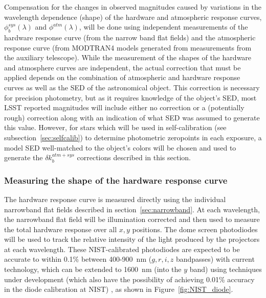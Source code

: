 \documentclass[12pt,preprint]{aastex}
\begin{document}
Compensation for the changes in observed magnitudes caused by
variations in the wavelength dependence (shape) of the hardware and
atmospheric response curves, $\phi_b^{sys}(\lambda)$ and
$\phi^{atm}(\lambda)$, will be done using independent measurements of
the hardware response curve (from the narrow band flat fields) and the
atmospheric response curve (from MODTRAN4 models generated from
measurements from the auxiliary telescope).  While the measurement of
the shapes of the hardware and atmosphere curves are independent, the
actual correction that must be applied depends on the combination of
atmospheric and hardware response curves as well as the SED of the
astronomical object.  This correction is necessary for precision
photometry, but as it requires knowledge of the object's SED, most
LSST reported magnitudes will include either no correction or a
(potentially rough) correction along with an indication of what SED
was assumed to generate this value. However, for stars which will be
used in self-calibration (see subsection~\ref{sec:selfcalib}) to
determine photometric zeropoints in each exposure, a model SED
well-matched to the object's colors will be chosen and used to
generate the $\delta k_b^{atm+sys}$ corrections described in this
section.

\subsubsection{Measuring the shape of the hardware response curve}
\label{sec:phi_hardware}

The hardware response curve is measured directly using the individual
narrowband flat fields described in section~\ref{sec:narrowband}. At
each wavelength, the narrowband flat field will be illumination
corrected and then used to measure the total hardware response over
all $x,y$ positions. The dome screen photodiodes will be used to track
the relative intensity of the light produced by the projectors at each
wavelength. These NIST-calibrated photodiodes are expected to be
accurate to within 0.1\% between 400-900~nm ($g,r,i,z$ bandpasses)
with current technology, which can be extended to 1600~nm (into the
$y$ band) using techniques under development (which also have the
possibility of achieving 0.01\% accuracy in the diode calibration at
NIST) \citep{Eppeldauer09}, as shown in Figure~\ref{fig:NIST_diode}. 
\end{document}
